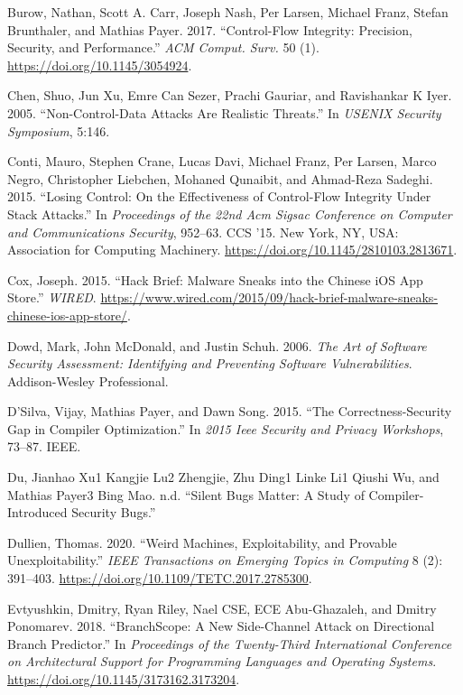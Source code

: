 \documentclass[a4paper,]{report}
\begin{document}
\leavevmode\hypertarget{ref-Burow2017}{}%
Burow, Nathan, Scott A. Carr, Joseph Nash, Per Larsen, Michael Franz,
Stefan Brunthaler, and Mathias Payer. 2017. ``Control-Flow Integrity:
Precision, Security, and Performance.'' \emph{ACM Comput. Surv.} 50 (1).
\url{https://doi.org/10.1145/3054924}.

\leavevmode\hypertarget{ref-Chen2005}{}%
Chen, Shuo, Jun Xu, Emre Can Sezer, Prachi Gauriar, and Ravishankar K
Iyer. 2005. ``Non-Control-Data Attacks Are Realistic Threats.'' In
\emph{USENIX Security Symposium}, 5:146.

\leavevmode\hypertarget{ref-Conti2015}{}%
Conti, Mauro, Stephen Crane, Lucas Davi, Michael Franz, Per Larsen,
Marco Negro, Christopher Liebchen, Mohaned Qunaibit, and Ahmad-Reza
Sadeghi. 2015. ``Losing Control: On the Effectiveness of Control-Flow
Integrity Under Stack Attacks.'' In \emph{Proceedings of the 22nd Acm
Sigsac Conference on Computer and Communications Security}, 952--63. CCS
'15. New York, NY, USA: Association for Computing Machinery.
\url{https://doi.org/10.1145/2810103.2813671}.

\leavevmode\hypertarget{ref-Cox2015}{}%
Cox, Joseph. 2015. ``Hack Brief: Malware Sneaks into the Chinese iOS App
Store.'' \emph{WIRED}.
\url{https://www.wired.com/2015/09/hack-brief-malware-sneaks-chinese-ios-app-store/}.

\leavevmode\hypertarget{ref-Dowd2006}{}%
Dowd, Mark, John McDonald, and Justin Schuh. 2006. \emph{The Art of
Software Security Assessment: Identifying and Preventing Software
Vulnerabilities}. Addison-Wesley Professional.

\leavevmode\hypertarget{ref-d2015correctness}{}%
D'Silva, Vijay, Mathias Payer, and Dawn Song. 2015. ``The
Correctness-Security Gap in Compiler Optimization.'' In \emph{2015 Ieee
Security and Privacy Workshops}, 73--87. IEEE.

\leavevmode\hypertarget{ref-dusilent}{}%
Du, Jianhao Xu1 Kangjie Lu2 Zhengjie, Zhu Ding1 Linke Li1 Qiushi Wu, and
Mathias Payer3 Bing Mao. n.d. ``Silent Bugs Matter: A Study of
Compiler-Introduced Security Bugs.''

\leavevmode\hypertarget{ref-Dullien2020}{}%
Dullien, Thomas. 2020. ``Weird Machines, Exploitability, and Provable
Unexploitability.'' \emph{IEEE Transactions on Emerging Topics in
Computing} 8 (2): 391--403.
\url{https://doi.org/10.1109/TETC.2017.2785300}.

\leavevmode\hypertarget{ref-Evtyushkin2018}{}%
Evtyushkin, Dmitry, Ryan Riley, Nael CSE, ECE Abu-Ghazaleh, and Dmitry
Ponomarev. 2018. ``BranchScope: A New Side-Channel Attack on Directional
Branch Predictor.'' In \emph{Proceedings of the Twenty-Third
International Conference on Architectural Support for Programming
Languages and Operating Systems}.
\url{https://doi.org/10.1145/3173162.3173204}.
\end{document}
